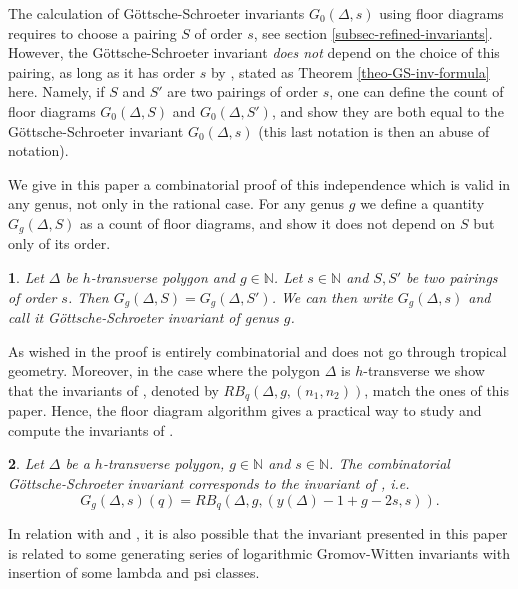 \documentclass[11pt]{article}
\theoremstyle{definition}
\numberwithin{equation}{section}
\newcommand{\N}{\mathbb{N}}
\theoremstyle{plain}
\newtheorem*{namedtheorem}{\theoremname}
\newcommand{\theoremname}{Theorem}
\newenvironment{named}[1]{\renewcommand{\theoremname}{#1}\begin{namedtheorem}}{\end{namedtheorem}}
\begin{document}
The calculation of Göttsche-Schroeter invariants $G_0(\Delta,s)$ using floor diagrams requires to choose a pairing $S$ of order $s$, see section \ref{subsec-refined-invariants}. However, the Göttsche-Schroeter invariant \emph{does not} depend on the choice of this pairing, as long as it has order $s$ by \cite[Theorem 2.13]{brugalle_polynomiality_2022}, stated as Theorem \ref{theo-GS-inv-formula} here. Namely, if $S$ and $S'$ are two pairings of order $s$, one can define the count of floor diagrams $G_0(\Delta,S)$ and $G_0(\Delta,S')$, and show they are both equal to the Göttsche-Schroeter invariant $G_0(\Delta,s)$ (this last notation is then an abuse of notation).

We give in this paper a combinatorial proof of this independence which is valid in any genus, not only in the rational case. For any genus $g$ we define a quantity $G_g(\Delta,S)$ as a count of floor diagrams, and show it does not depend on $S$ but only of its order.

\begin{named}{Theorem \ref{theo-invS}}
Let $\Delta$ be $h$-transverse polygon and $g\in\N$. Let $s \in \N$ and $S,S'$ be two pairings of order $s$. Then $G_g(\Delta,S) = G_g(\Delta,S')$. We can then write $G_g(\Delta,s)$ and call it \emph{Göttsche-Schroeter invariant of genus $g$}.
\end{named}

As wished in \cite[Remark 2.14]{brugalle_polynomiality_2022} the proof is entirely combinatorial and does not go through tropical geometry.  
Moreover, in the case where the polygon $\Delta$ is $h$-transverse we show that the invariants of \cite{shustin-2024-refined}, denoted by $RB_q(\Delta,g,(n_1,n_2))$, match the ones of this paper. Hence, the floor diagram algorithm gives a practical way to study and compute the invariants of \cite{shustin-2024-refined}.


\begin{named}{Proposition \ref{prop-equal-shustin}}
Let $\Delta$ be a $h$-transverse polygon, $g\in\N$ and $s\in\N$. The combinatorial Göttsche-Schroeter invariant corresponds to the invariant of \cite{shustin-2024-refined}, i.e. 
\[ G_g(\Delta,s)(q) = RB_q(\Delta,g,(y(\Delta)-1+g-2s,s)) . \]
\end{named}

In relation with \cite{bousseau_refined_2021} and \cite{kennedyhunt-2024-tropical}, it is also possible that the invariant presented in this paper is related to some generating series of logarithmic Gromov-Witten invariants with insertion of some lambda and psi classes.
\end{document}
